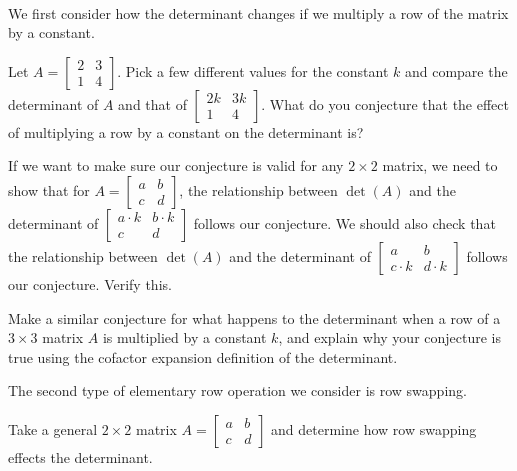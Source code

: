 \begin{pa} \label{pa:4_f} ~
\be
\item We first consider how the determinant changes if we multiply a row of the matrix by a constant.

\ba 
\item Let $A = \left[ \begin{array}{cc} 2&3 \\ 1&4 \end{array} \right]$. Pick a few different values for the constant $k$ and compare the determinant of $A$ and that of $\left[ \begin{array}{cc} 2k& 3k \\ 1&4 \end{array} \right]$. What do you conjecture that the effect of multiplying a row by a constant on the determinant is?


\item If we want to make sure our conjecture is valid for any $2\times 2$ matrix, we need to show that for $A = \left[ \begin{array}{cc} a&b\\c&d \end{array} \right]$, the relationship between $\det(A)$ and the determinant of $\left[ \begin{array}{cc} a\cdot k&b\cdot k\\c&d \end{array} \right]$ follows our conjecture. We should also check that the relationship between $\det(A)$ and the determinant of $\left[ \begin{array}{cc} a&b\\c\cdot k&d\cdot k \end{array} \right]$ follows our conjecture. Verify this.



\item Make a similar conjecture for what happens to the determinant when a row of a $3\times 3$ matrix $A$ is multiplied by a constant $k$, and explain why your conjecture is true using the cofactor expansion definition of the determinant.



\ea

\item The second type of elementary row operation we consider is row swapping. 

\ba \item Take a general $2\times 2$ matrix $A = \left[ \begin{array}{cc} a&b\\c&d \end{array} \right]$ and determine how row swapping effects the determinant.




\end{pa}
